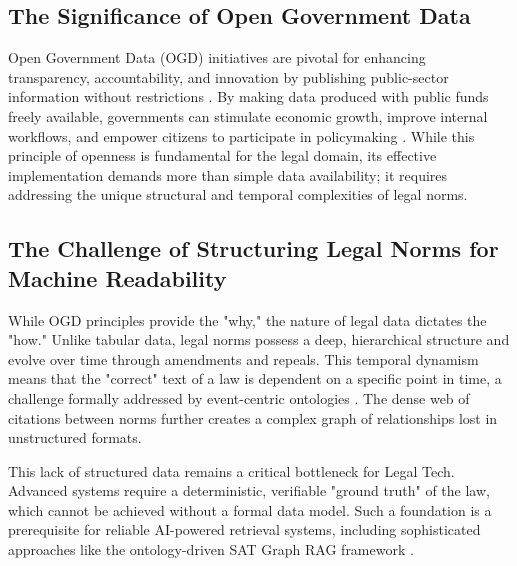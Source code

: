 \documentclass[11pt]{article}
\begin{document}
\subsection{The Significance of Open Government Data}
Open Government Data (OGD) initiatives are pivotal for enhancing transparency, accountability, and innovation by publishing public-sector information without restrictions \cite{ubaldi2013ogd}. By making data produced with public funds freely available, governments can stimulate economic growth, improve internal workflows, and empower citizens to participate in policymaking \cite{lathrop2010open}. While this principle of openness is fundamental for the legal domain, its effective implementation demands more than simple data availability; it requires addressing the unique structural and temporal complexities of legal norms.

\subsection{The Challenge of Structuring Legal Norms for Machine Readability}
While OGD principles provide the "why," the nature of legal data dictates the "how." Unlike tabular data, legal norms possess a deep, hierarchical structure and evolve over time through amendments and repeals. This temporal dynamism means that the "correct" text of a law is dependent on a specific point in time, a challenge formally addressed by event-centric ontologies \cite{demartim2025temporal}. The dense web of citations between norms further creates a complex graph of relationships lost in unstructured formats.

This lack of structured data remains a critical bottleneck for Legal Tech. Advanced systems require a deterministic, verifiable "ground truth" of the law, which cannot be achieved without a formal data model. Such a foundation is a prerequisite for reliable AI-powered retrieval systems, including sophisticated approaches like the ontology-driven SAT Graph RAG framework \cite{demartim2025graphrag}.
\end{document}
